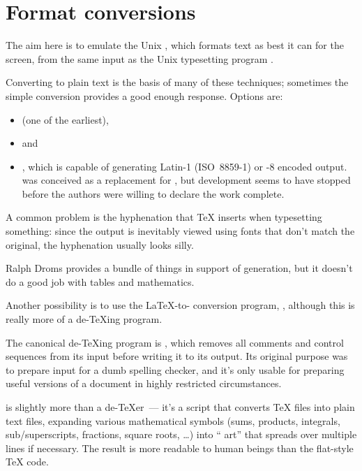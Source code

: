 
\section{Format conversions}


The aim here is to emulate the Unix , which formats
text as best it can for the screen, from the same
input as the Unix typesetting program .

Converting  to plain text is the basis of many of these
techniques; sometimes the simple conversion provides a good enough
response.  Options are:
\begin{itemize}
\item {} (one of the earliest),
\item {} and
\item {}, which is capable of generating Latin-1
  (ISO~8859-1) or -8 encoded output.   was
  conceived as a replacement for , but development
  seems to have stopped before the authors were willing to declare the
  work complete.
\end{itemize}
A common problem is the hyphenation that \TeX{} inserts when
typesetting something: since the output is inevitably viewed using
fonts that don't match the original, the hyphenation usually looks
silly.

Ralph Droms provides a  bundle of things in support of
 generation,
but it doesn't do a good job with tables and mathematics.

Another possibility is to
use the \LaTeX{}-to- conversion program, ,
although this is really more of a de-\TeX{}ing program.

The canonical de-\TeX{}ing program is , which removes
all comments and control sequences 
from its input before writing it to its output.  Its original purpose
was to prepare input for a dumb spelling checker, and it's only usable
for preparing useful  versions of a document in highly
restricted circumstances.

 is slightly more than a de-TeX{}er~--- it's a
 script that converts \TeX{} files into
plain text files, expanding various mathematical symbols
(sums, products, integrals, sub/superscripts, fractions, square
roots, \dots{}\@) into `` art'' that spreads over
multiple lines if necessary. The result is more readable to human
beings than the flat-style \TeX{} code.

